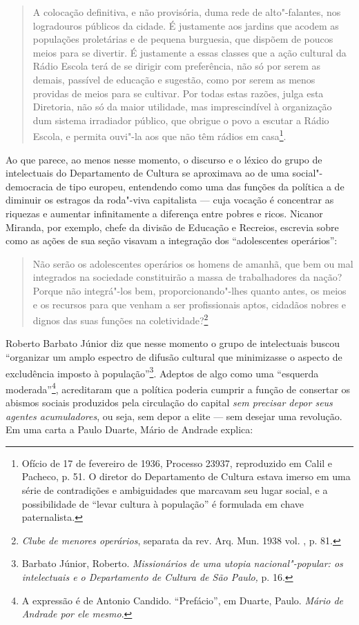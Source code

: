 \begin{quote}
A colocação definitiva, e não provisória, duma rede de alto"-falantes,
nos logradouros públicos da cidade. É justamente aos jardins que acodem
as populações proletárias e de pequena burguesia, que dispõem de poucos
meios para se divertir. É justamente a essas classes que a ação cultural
da Rádio Escola terá de se dirigir com preferência, não só por serem as
demais, passível de educação e sugestão, como por serem as menos
providas de meios para se cultivar. Por todas estas razões, julga esta
Diretoria, não só da maior utilidade, mas imprescindível à organização
dum sistema irradiador público, que obrigue o povo a escutar a Rádio
Escola, e permita ouvi"-la aos que não têm rádios em casa\footnote{Ofício
  de 17 de fevereiro de 1936, Processo 23937, reproduzido em Calil e
  Pacheco, p. 51. O diretor do Departamento de Cultura estava imerso em
  uma série de contradições e ambiguidades que marcavam seu lugar
  social, e a possibilidade de ``levar cultura à população'' é formulada
  em chave paternalista.}.
\end{quote}

Ao que parece, ao menos nesse momento, o discurso e o léxico do grupo de
intelectuais do Departamento de Cultura se aproximava ao de uma
social"-democracia de tipo europeu, entendendo como uma das funções da
política a de diminuir os estragos da roda"-viva capitalista --- cuja
vocação é concentrar as riquezas e aumentar infinitamente a diferença
entre pobres e ricos. Nicanor Miranda, por exemplo, chefe da divisão de
Educação e Recreios, escrevia sobre como as ações de sua seção visavam a
integração dos ``adolescentes operários'':

\begin{quote}
Não serão os adolescentes operários os homens de amanhã, que bem ou mal
integrados na sociedade constituirão a massa de trabalhadores da nação?
Porque não integrá"-los bem, proporcionando"-lhes quanto antes, os meios e
os recursos para que venham a ser profissionais aptos, cidadãos nobres e
dignos das suas funções na coletividade?\footnote{\emph{Clube de menores
  operários}, separata da rev. Arq. Mun. 1938 vol. , p. 81.}
\end{quote}

Roberto Barbato Júnior diz que nesse momento o grupo de intelectuais
buscou ``organizar um amplo espectro de difusão cultural que minimizasse
o aspecto de excludência imposto à população''\footnote{Barbato Júnior,
  Roberto. \emph{Missionários de uma utopia nacional"-popular: os
  intelectuais e o Departamento de Cultura de São Paulo,} p. 16.}.
Adeptos de algo como uma ``esquerda moderada''\footnote{A expressão é de
  Antonio Candido. ``Prefácio'', em Duarte, Paulo. \emph{Mário de
  Andrade por ele mesmo}.}, acreditaram que a política poderia cumprir a
função de consertar os abismos sociais produzidos pela circulação do
capital \emph{sem precisar depor seus agentes acumuladores}, ou seja,
sem depor a elite --- sem desejar uma revolução. Em uma carta a Paulo
Duarte, Mário de Andrade explica:


